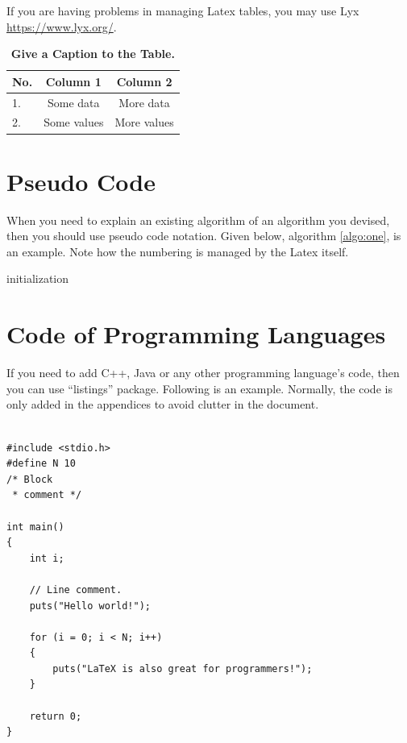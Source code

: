 \documentclass{FastFyp}
\begin{document}
If you are having problems in managing Latex tables, you may use Lyx \url{https://www.lyx.org/}. 


\begin{table}[hbt]

\begin{center}
\caption{\label{tbl:SomeTable} \textbf{Give a Caption to the Table.}}
\begin{tabular}{|l|c|c|} 
\hline
\textbf{No.}&\textbf{Column 1}&\textbf{Column 2}\\
\hline
1.&Some data&More data\\
\hline
2.&Some values&More values\\
\hline
\end {tabular}

\end{center}

\end{table}

\section{Pseudo Code}
When you need to explain an existing algorithm of an algorithm you devised, then you should use pseudo code notation. Given below, algorithm  \ref{algo:one}, is an example. Note how the numbering is managed by the Latex itself.

\begin{algorithm}[H]
 initialization\;
 \caption{How to write algorithms}
 \label{algo:one}
\end{algorithm}

\section{Code of Programming Languages}
If you need to add C++, Java or any other programming language's code, then you can use ``listings'' package. Following is an example. Normally, the code is only added in the appendices to avoid clutter in the document.

\begin{lstlisting}

#include <stdio.h>
#define N 10
/* Block
 * comment */

int main()
{
    int i;

    // Line comment.
    puts("Hello world!");
    
    for (i = 0; i < N; i++)
    {
        puts("LaTeX is also great for programmers!");
    }

    return 0;
}
\end{lstlisting}
\end{document}
